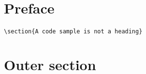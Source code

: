 \documentclass{article}
\begin{document}
\section*{Preface}
\begin{verbatim}
\section{A code sample is not a heading}
\end{verbatim}
\section{Outer section}\label{sec:outer}
\ifdefined\TestCustom\setcounter{subsection}{7}\fi

\end{document}
